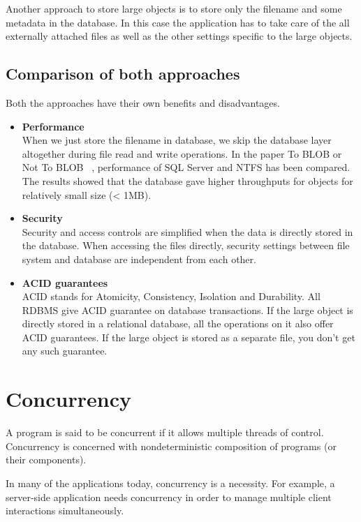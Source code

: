 Another approach to store large objects is to store only the filename and some metadata in the database. In this case the application has to take care of the all externally attached files as well as the other settings specific to the large objects.

\subsection{Comparison of both approaches}
Both the approaches have their own benefits and disadvantages.

\begin{itemize}
  \item{\textbf{Performance}} \\
    When we just store the filename in database, we skip the database layer altogether during file read and write operations. In the paper To BLOB or Not To BLOB ~\cite{sears2007blob}, performance of SQL Server and NTFS has been compared. The results showed that the database gave higher throughputs for objects for relatively small size (< 1MB).

  \item{\textbf{Security}} \\
    Security and access controls are simplified when the data is directly stored in the database. When accessing the files directly, security settings between file system and database are independent from each other.

  \item{\textbf{ACID guarantees}} \\
    ACID stands for Atomicity, Consistency, Isolation and Durability. All RDBMS give ACID guarantee on database transactions. If the large object is directly stored in a relational database, all the operations on it also offer ACID guarantees. If the large object is stored as a separate file, you don't get any such guarantee.
\end{itemize}

\section{Concurrency}
A program is said to be concurrent if it allows multiple threads of control. Concurrency is concerned with nondeterministic composition of programs (or their components).

In many of the applications today, concurrency is a necessity. For example, a server-side application needs concurrency in order to manage multiple client interactions simultaneously.

